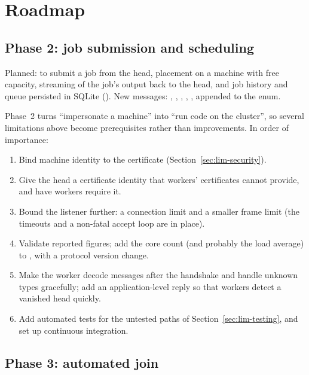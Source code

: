 \documentclass{article}
\begin{document}
\section{Roadmap}

\subsection{Phase 2: job submission and scheduling}

Planned:  to submit a job from the head, placement on
a machine with free capacity, streaming of the job's output back to the
head, and job history and queue persisted in SQLite ().
New messages: , , ,
, , appended to the enum.

Phase~2 turns ``impersonate a machine'' into ``run code on the cluster'',
so several limitations above become prerequisites rather than
improvements. In order of importance:

\begin{enumerate}
  \item Bind machine identity to the certificate
    (Section~\ref{sec:lim-security}).
  \item Give the head a certificate identity that workers' certificates
    cannot provide, and have workers require it.
  \item Bound the listener further: a connection limit and a smaller
    frame limit (the timeouts and a non-fatal accept loop are in
    place).
  \item Validate reported figures; add the core count (and probably the
    load average) to , with a protocol version change.
  \item Make the worker decode messages after the handshake and handle
    unknown types gracefully; add an application-level reply so that
    workers detect a vanished head quickly.
  \item Add automated tests for the untested paths of
    Section~\ref{sec:lim-testing}, and set up continuous integration.
\end{enumerate}

\subsection{Phase 3: automated join}
\end{document}
